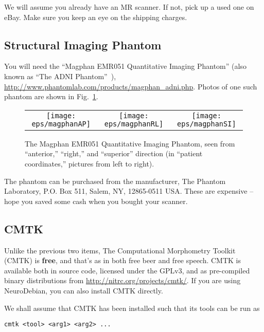\documentclass{InsightArticle}
\begin{document}
We will assume you already have an MR scanner. If not, pick up a used one on
eBay. Make sure you keep an eye on the shipping charges.

\subsection{Structural Imaging Phantom}

You will need the ``Magphan\textsuperscript{\textregistered} EMR051
Quantitative Imaging Phantom'' (also known as ``The ADNI
Phantom''~\cite{GuntBernBoro:2009}),
\url{http://www.phantomlab.com/products/magphan_adni.php}. Photos of one such
phantom are shown in Fig.~\ref{fig:Phantom}.

\begin{figure}[tbp]
\begin{center}
\setlength\tabcolsep{1mm}
\begin{tabular}{ccc}
\texttt{[image: eps/magphanAP]} &
\texttt{[image: eps/magphanRL]} &
\texttt{[image: eps/magphanSI]}
\end{tabular}
\end{center}
\caption{The Magphan\textsuperscript{\textregistered} EMR051 Quantitative
Imaging Phantom, seen from ``anterior,'' ``right,'' and ``superior''
direction (in ``patient coordinates,'' pictures from left to right).}
\label{fig:Phantom}
\end{figure}

The phantom can be purchased from the manufacturer, The Phantom Laboratory,
P.O. Box 511, Salem, NY, 12865-0511 USA. These are expensive -- hope you saved
some cash when you bought your scanner.

\subsection{CMTK}

Unlike the previous two items, The Computational Morphometry Toolkit (CMTK) is
{\bf free}, and that's as in both free beer and free speech. CMTK is available
both in source code, licensed under the GPLv3, and as pre-compiled binary
distributions from \url{http://nitrc.org/projects/cmtk/}. If you are using
NeuroDebian, you can also install CMTK directly.

We shall assume that CMTK has been installed such that its tools can be run as
\begin{verbatim}
cmtk <tool> <arg1> <arg2> ...
\end{verbatim}
\end{document}

